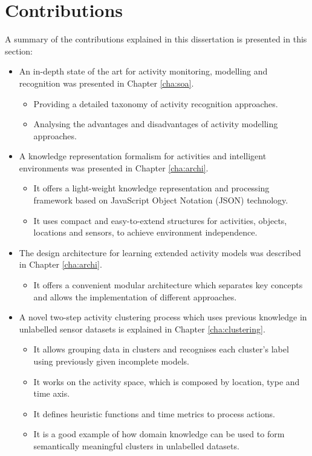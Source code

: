 \section{Contributions}
\label{sec:conclusions:contrib}

A summary of the contributions explained in this dissertation is presented in this section:

\begin{itemize}
 \item An in-depth state of the art for activity monitoring, modelling and recognition was presented in Chapter \ref{cha:soa}.
 \begin{itemize}
  \item Providing a detailed taxonomy of activity recognition approaches.
  \item Analysing the advantages and disadvantages of activity modelling approaches.
 \end{itemize}

 \item A knowledge representation formalism for activities and intelligent environments was presented in Chapter \ref{cha:archi}.
 \begin{itemize}
  \item It offers a light-weight knowledge representation and processing framework based on JavaScript Object Notation (JSON) technology.
  \item It uses compact and easy-to-extend structures for activities, objects, locations and sensors, to achieve environment independence.
 \end{itemize}

 \item The design architecture for learning extended activity models was described in Chapter \ref{cha:archi}.
 \begin{itemize}
  \item It offers a convenient modular architecture which separates key concepts and allows the implementation of different approaches.
 \end{itemize}

 \item A novel two-step activity clustering process which uses previous knowledge in unlabelled sensor datasets is explained in Chapter \ref{cha:clustering}.
 \begin{itemize}  
  \item It allows grouping data in clusters and recognises each cluster's label using previously given incomplete models.
  \item It works on the activity space, which is composed by location, type and time axis.
  \item It defines heuristic functions and time metrics to process actions.
  \item It is a good example of how domain knowledge can be used to form semantically meaningful clusters in unlabelled datasets.
 \end{itemize}


\end{itemize}
